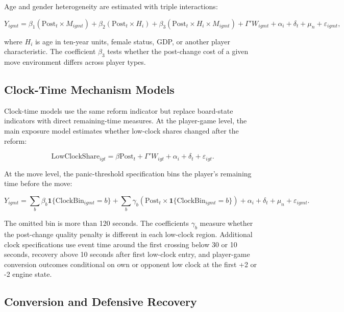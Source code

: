 Age and gender heterogeneity are estimated with triple interactions:

\begin{equation}
\label{eq:movetriple}
Y_{igmt}
= \beta_1(\text{Post}_t \times M_{igmt})
+ \beta_2(\text{Post}_t \times H_i)
+ \beta_3(\text{Post}_t \times H_i \times M_{igmt})
+ \Gamma' W_{igmt}
+ \alpha_i
+ \delta_t
+ \mu_n
+ \varepsilon_{igmt},
\end{equation}

\noindent where \(H_i\) is age in ten-year units, female status, GDP, or another player characteristic. The coefficient \(\beta_3\) tests whether the post-change cost of a given move environment differs across player types.

\subsection{Clock-Time Mechanism Models}

Clock-time models use the same reform indicator but replace board-state indicators with direct remaining-time measures. At the player-game level, the main exposure model estimates whether low-clock shares changed after the reform:

\begin{equation}
\label{eq:clockexposure}
\text{LowClockShare}_{igt}
= \beta \text{Post}_t
+ \Gamma' W_{igt}
+ \alpha_i
+ \delta_t
+ \varepsilon_{igt}.
\end{equation}

\noindent At the move level, the panic-threshold specification bins the player's remaining time before the move:

\begin{equation}
\label{eq:clockbins}
Y_{igmt}
= \sum_b \beta_b \mathbf{1}\{\text{ClockBin}_{igmt}=b\}
+ \sum_b \gamma_b \left(\text{Post}_t \times \mathbf{1}\{\text{ClockBin}_{igmt}=b\}\right)
+ \alpha_i+\delta_t+\mu_n+\varepsilon_{igmt}.
\end{equation}

\noindent The omitted bin is more than 120 seconds. The coefficients \(\gamma_b\) measure whether the post-change quality penalty is different in each low-clock region. Additional clock specifications use event time around the first crossing below 30 or 10 seconds, recovery above 10 seconds after first low-clock entry, and player-game conversion outcomes conditional on own or opponent low clock at the first +2 or -2 engine state.

\subsection{Conversion and Defensive Recovery}

